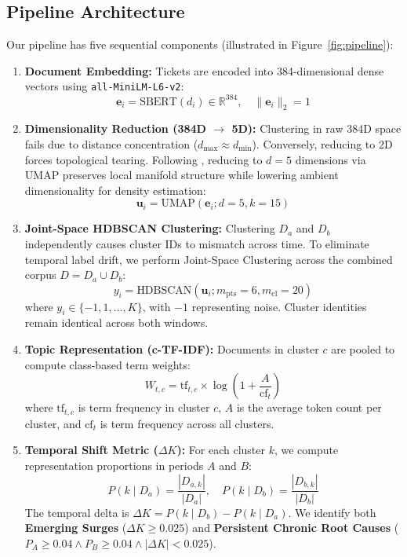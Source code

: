 \documentclass[sigconf,nonacm]{acmart}
\begin{document}
\subsection{Pipeline Architecture}
Our pipeline has five sequential components (illustrated in Figure~\ref{fig:pipeline}):
\begin{enumerate}
    \item \textbf{Document Embedding:} Tickets are encoded into 384-dimensional dense vectors using \texttt{all-MiniLM-L6-v2}:
    \begin{equation}
        \mathbf{e}_i = \text{SBERT}(d_i) \in \mathbb{R}^{384}, \quad \|\mathbf{e}_i\|_2 = 1
    \end{equation}
    \item \textbf{Dimensionality Reduction (384D $\rightarrow$ 5D):} Clustering in raw 384D space fails due to distance concentration ($d_{\max} \approx d_{\min}$). Conversely, reducing to 2D forces topological tearing. Following \citet{grootendorst2022bertopic}, reducing to $d = 5$ dimensions via UMAP preserves local manifold structure while lowering ambient dimensionality for density estimation:
    \begin{equation}
        \mathbf{u}_i = \text{UMAP}(\mathbf{e}_i; d = 5, k = 15)
    \end{equation}
    \item \textbf{Joint-Space HDBSCAN Clustering:} Clustering $D_a$ and $D_b$ independently causes cluster IDs to mismatch across time. To eliminate temporal label drift, we perform Joint-Space Clustering across the combined corpus $D = D_a \cup D_b$:
    \begin{equation}
        y_i = \text{HDBSCAN}(\mathbf{u}_i; m_{\text{pts}} = 6, m_{\text{cl}} = 20)
    \end{equation}
    where $y_i \in \{-1, 1, \dots, K\}$, with $-1$ representing noise. Cluster identities remain identical across both windows.
    \item \textbf{Topic Representation (c-TF-IDF):} Documents in cluster $c$ are pooled to compute class-based term weights:
    \begin{equation}
        W_{t,c} = \text{tf}_{t,c} \times \log\left( 1 + \frac{A}{\text{cf}_t} \right)
    \end{equation}
    where $\text{tf}_{t,c}$ is term frequency in cluster $c$, $A$ is the average token count per cluster, and $\text{cf}_t$ is term frequency across all clusters.
    \item \textbf{Temporal Shift Metric ($\Delta K$):} For each cluster $k$, we compute representation proportions in periods $A$ and $B$:
    \begin{equation}
        P(k \mid D_a) = \frac{|D_{a,k}|}{|D_a|}, \quad P(k \mid D_b) = \frac{|D_{b,k}|}{|D_b|}
    \end{equation}
    The temporal delta is $\Delta K = P(k \mid D_b) - P(k \mid D_a)$. We identify both \textbf{Emerging Surges} ($\Delta K \ge 0.025$) and \textbf{Persistent Chronic Root Causes} ($P_A \ge 0.04 \land P_B \ge 0.04 \land |\Delta K| < 0.025$).
\end{enumerate}
\end{document}
